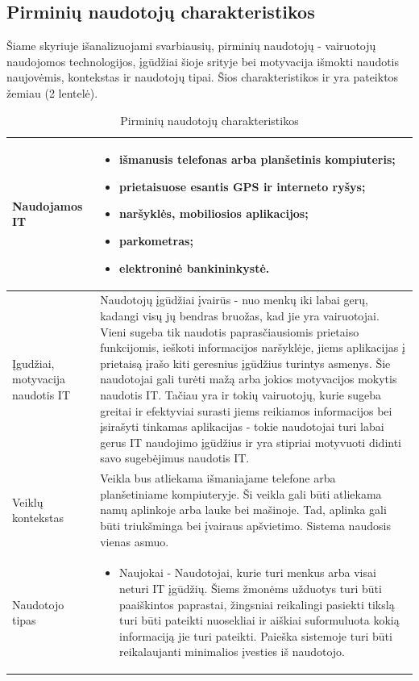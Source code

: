 \documentclass{VUMIFPSkursinis}
\begin{document}
\subsection{Pirminių naudotojų charakteristikos}

Šiame skyriuje išanalizuojami svarbiausių, pirminių naudotojų - vairuotojų naudojomos technologijos, įgūdžiai šioje srityje bei motyvacija išmokti naudotis naujovėmis, kontekstas ir naudotojų tipai. Šios charakteristikos ir yra pateiktos žemiau (2 lentelė).
\begin{table}[H]\footnotesize
  \centering
  \caption{Pirminių naudotojų charakteristikos}
  {\begin{tabular}{|p{}|p{}|} 
	\hline
	Naudojamos IT  & \begin{itemize}
						  \item išmanusis telefonas arba planšetinis kompiuteris;
						  \item	prietaisuose esantis GPS ir interneto ryšys;
						  \item	naršyklės, mobiliosios aplikacijos;
						  \item	parkometras;
						  \item	elektroninė bankininkystė.
					  \end{itemize}
					  \\
	\hline
    Įgudžiai, motyvacija naudotis IT  & Naudotojų įgūdžiai įvairūs - nuo menkų iki labai gerų, kadangi visų jų bendras bruožas, kad jie yra vairuotojai. Vieni sugeba tik naudotis paprasčiausiomis prietaiso funkcijomis, ieškoti informacijos naršyklėje, jiems aplikacijas į prietaisą įrašo kiti geresnius įgūdžius turintys asmenys. Šie naudotojai gali turėti mažą arba jokios motyvacijos mokytis naudotis IT. Tačiau yra ir tokių vairuotojų, kurie sugeba greitai ir efektyviai surasti jiems reikiamos informacijos bei įsirašyti tinkamas aplikacijas - tokie naudotojai turi labai gerus IT naudojimo įgūdžius ir yra stipriai motyvuoti didinti savo sugebėjimus naudotis IT.   \\
	\hline
    Veiklų kontekstas	& Veikla bus atliekama išmaniajame telefone arba planšetiniame kompiuteryje. Ši veikla gali būti atliekama namų aplinkoje arba lauke bei mašinoje. Tad, aplinka gali būti triukšminga bei įvairaus apšvietimo. Sistema naudosis vienas asmuo.     	    		  \\
	\hline
    Naudotojo tipas 	 & \begin{itemize}
							  \item Naujokai - Naudotojai, kurie turi menkus arba visai neturi IT įgūdžių. Šiems žmonėms užduotys turi būti paaiškintos paprastai, žingsniai reikalingi pasiekti tikslą turi būti pateikti nuosekliai ir aiškiai suformuluota kokią informaciją jie turi pateikti. Paieška sistemoje turi būti reikalaujanti minimalios įvesties iš naudotojo.


\end{itemize}
\end{tabular}}
\end{table}
\end{document}
